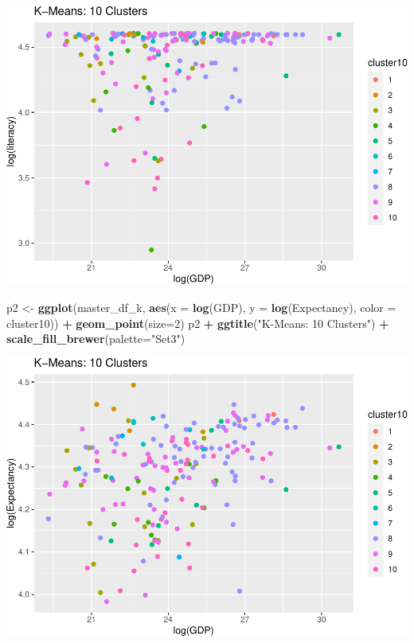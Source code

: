 \documentclass[]{article}
\newenvironment{Shaded}{\begin{snugshade}}{\end{snugshade}}
\newcommand{\DataTypeTok}[1]{\textcolor[rgb]{0.13,0.29,0.53}{#1}}
\newcommand{\DecValTok}[1]{\textcolor[rgb]{0.00,0.00,0.81}{#1}}
\newcommand{\KeywordTok}[1]{\textcolor[rgb]{0.13,0.29,0.53}{\textbf{#1}}}
\newcommand{\NormalTok}[1]{#1}
\newcommand{\OperatorTok}[1]{\textcolor[rgb]{0.81,0.36,0.00}{\textbf{#1}}}
\newcommand{\StringTok}[1]{\textcolor[rgb]{0.31,0.60,0.02}{#1}}
\begin{document}
\includegraphics{eda_files/figure-latex/unnamed-chunk-30-4.pdf}

\begin{Shaded}
\begin{Highlighting}[]
\NormalTok{p2 <-}\StringTok{ }\KeywordTok{ggplot}\NormalTok{(master_df_k, }\KeywordTok{aes}\NormalTok{(}\DataTypeTok{x =} \KeywordTok{log}\NormalTok{(GDP), }\DataTypeTok{y =} \KeywordTok{log}\NormalTok{(Expectancy), }\DataTypeTok{color =}\NormalTok{ cluster10)) }\OperatorTok{+}
\StringTok{  }\KeywordTok{geom_point}\NormalTok{(}\DataTypeTok{size=}\DecValTok{2}\NormalTok{)}
\NormalTok{p2 }\OperatorTok{+}\StringTok{ }\KeywordTok{ggtitle}\NormalTok{(}\StringTok{"K-Means: 10 Clusters"}\NormalTok{) }\OperatorTok{+}\StringTok{ }\KeywordTok{scale_fill_brewer}\NormalTok{(}\DataTypeTok{palette=}\StringTok{"Set3"}\NormalTok{)}
\end{Highlighting}
\end{Shaded}

\includegraphics{eda_files/figure-latex/unnamed-chunk-30-5.pdf}
\end{document}
